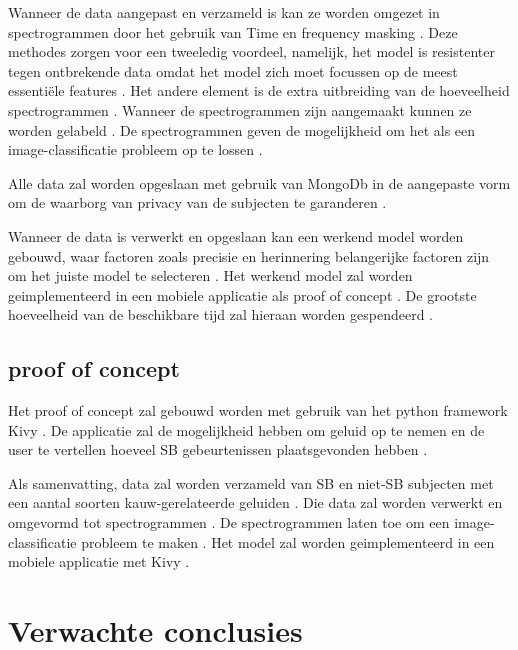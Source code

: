 \documentclass{hogent-article}
\begin{document}
\bigbreak
Wanneer de data aangepast en verzameld is kan ze worden omgezet in spectrogrammen door het gebruik van Time en frequency masking .
Deze methodes zorgen voor een tweeledig voordeel, namelijk, het model is resistenter tegen ontbrekende data omdat het model zich moet focussen op de meest essentiële features . 
Het andere element is de extra uitbreiding van de hoeveelheid spectrogrammen .
Wanneer de spectrogrammen zijn aangemaakt kunnen ze worden gelabeld .
De spectrogrammen geven de mogelijkheid om het als een image-classificatie probleem op te lossen .

\bigbreak
Alle data zal worden opgeslaan met gebruik van MongoDb in de aangepaste vorm om de waarborg van privacy van de subjecten te garanderen .
\bigbreak

Wanneer de data is verwerkt en opgeslaan kan een werkend model worden gebouwd, waar factoren zoals precisie en herinnering belangerijke factoren zijn om het juiste model te selecteren .
Het werkend model zal worden geimplementeerd in een mobiele applicatie als proof of concept .
De grootste hoeveelheid van de beschikbare tijd zal hieraan worden gespendeerd .


\subsection{proof of concept}

Het proof of concept zal gebouwd worden met gebruik van het python framework Kivy .
De applicatie zal de mogelijkheid hebben om geluid op te nemen en de user te vertellen hoeveel SB gebeurtenissen plaatsgevonden hebben .

\bigbreak
Als samenvatting, data zal worden verzameld van SB en niet-SB subjecten met een aantal soorten kauw-gerelateerde geluiden . Die data zal worden verwerkt en omgevormd tot spectrogrammen .
De spectrogrammen laten toe om een image-classificatie probleem te maken .
Het model zal worden geimplementeerd in een mobiele applicatie met Kivy .







\section{Verwachte conclusies}

\end{document}
